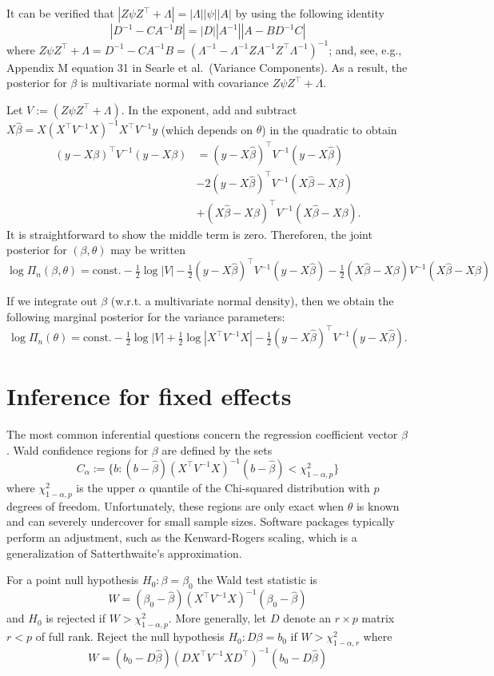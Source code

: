 \documentclass[
]{book}
\begin{document}
It can be verified that \(|Z\psi Z^\top +\Lambda| = |\Lambda||\psi||A|\) by using the following identity
\[|D^{-1} - CA^{-1}B| = |D||A^{-1}||A - BD^{-1}C|\]
where \(Z\psi Z^\top +\Lambda = D^{-1} - CA^{-1}B = (\Lambda^{-1} - \Lambda^{-1}ZA^{-1}Z^\top \Lambda^{-1})^{-1}\); and, see, e.g., Appendix M equation 31 in Searle et al.~(Variance Components). As a result, the posterior for \(\beta\) is multivariate normal with covariance \(Z\psi Z^\top +\Lambda\).

Let \(V := (Z\psi Z^\top +\Lambda)\). In the exponent, add and subtract \(X\hat\beta = X(X^\top V^{-1} X)^{-1}X^\top V^{-1}y\) (which depends on \(\theta\)) in the quadratic to obtain
\begin{align*}
\left(y - X\beta\right)^\top V^{-1}(y - X\beta) & = \left(y - X\hat\beta\right)^\top V^{-1}(y - X\hat\beta)\\
& -2 \left(y - X\hat\beta\right)^\top V^{-1}(X\hat\beta - X\beta)\\
& + \left(X\hat\beta - X\beta\right)^\top V^{-1}(X\hat\beta - X\beta).
\end{align*}
It is straightforward to show the middle term is zero. Thereforen, the joint posterior for \((\beta, \theta)\) may be written
\[\log \Pi_n(\beta, \theta) = \text{const}. -\tfrac12\log|V|-\tfrac12(y-X\hat\beta)^\top V^{-1}(y-X\hat\beta) -\tfrac12(X\hat\beta - X\beta)V^{-1}(X\hat\beta - X\beta)\]

If we integrate out \(\beta\) (w.r.t. a multivariate normal density), then we obtain the following marginal posterior for the variance parameters:
\[\log\Pi_n(\theta) = \text{const.} - \tfrac{1}{2}\log|V| + \tfrac{1}{2}\log|X^\top V^{-1}X|-\tfrac12 \left(y - X\hat\beta\right)^\top V^{-1}(y - X\hat\beta).\]

\hypertarget{inference-for-fixed-effects}{%
\section{Inference for fixed effects}\label{inference-for-fixed-effects}}

The most common inferential questions concern the regression coefficient vector \(\beta\). Wald confidence regions for \(\beta\) are defined by the sets
\[C_\alpha := \{b: (b - \hat\beta)(X^\top V^{-1}X)^{-1}(b - \hat\beta)<\chi^2_{1-\alpha, p}\}\]
where \(\chi^2_{1-\alpha, p}\) is the upper \(\alpha\) quantile of the Chi-squared distribution with \(p\) degrees of freedom. Unfortunately, these regions are only exact when \(\theta\) is known and can severely undercover for small sample sizes. Software packages typically perform an adjustment, such as the Kenward-Rogers scaling, which is a generalization of Satterthwaite's approximation.

For a point null hypothesis \(H_0: \beta = \beta_{0}\) the Wald test statistic is
\[W = (\beta_0 - \hat\beta)(X^\top V^{-1}X)^{-1}(\beta_0 - \hat\beta)\]
and \(H_0\) is rejected if \(W > \chi^2_{1-\alpha, p}\). More generally, let \(D\) denote an \(r\times p\) matrix \(r<p\) of full rank. Reject the null hypothesis \(H_0:D\beta = b_0\) if \(W > \chi^2_{1-\alpha, r}\) where
\[W = (b_0 - D\hat\beta)(D X^\top V^{-1}X D^\top)^{-1}(b_0 - D\hat\beta)\]

  
\end{document}
